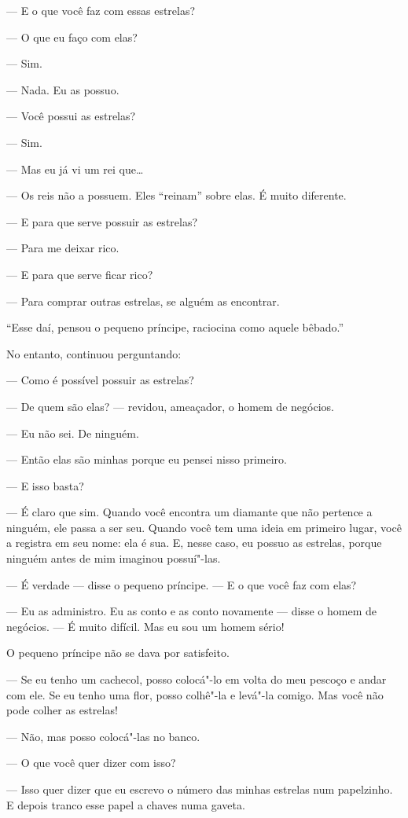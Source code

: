 \begin{Parallel}[p]{}{}
{--- E o que você faz com essas estrelas?

--- O que eu faço com elas?

--- Sim.

--- Nada. Eu as possuo.

--- Você possui as estrelas?

--- Sim.

--- Mas eu já vi um rei que\ldots{}

--- Os reis não a possuem. Eles ``reinam'' sobre elas. É muito diferente.

--- E para que serve possuir as estrelas?

--- Para me deixar rico.

--- E para que serve ficar rico?

--- Para comprar outras estrelas, se alguém as encontrar.

``Esse daí, pensou o pequeno príncipe, raciocina como aquele bêbado.''

No entanto, continuou perguntando:

--- Como é possível possuir as estrelas?

--- De quem são elas? --- revidou, ameaçador, o homem de negócios.

--- Eu não sei. De ninguém.

--- Então elas são minhas porque eu pensei nisso primeiro.

--- E isso basta?

--- É claro que sim. Quando você encontra um diamante que não pertence a
ninguém, ele passa a ser seu. Quando você tem uma ideia em primeiro
lugar, você a registra em seu nome: ela é sua. E, nesse caso, eu possuo
as estrelas, porque ninguém antes de mim imaginou possuí"-las.

--- É verdade --- disse o pequeno príncipe. --- E o que você faz com elas?

--- Eu as administro. Eu as conto e as conto novamente --- disse o homem de
negócios. --- É muito difícil. Mas eu sou um homem sério!

O pequeno príncipe não se dava por satisfeito.

--- Se eu tenho um cachecol, posso colocá"-lo em volta do meu pescoço e
andar com ele. Se eu tenho uma flor, posso colhê"-la e levá"-la comigo.
Mas você não pode colher as estrelas!

--- Não, mas posso colocá"-las no banco.

--- O que você quer dizer com isso?

--- Isso quer dizer que eu escrevo o número das minhas estrelas num
papelzinho. E depois tranco esse papel a chaves numa gaveta.

}
\end{Parallel}
